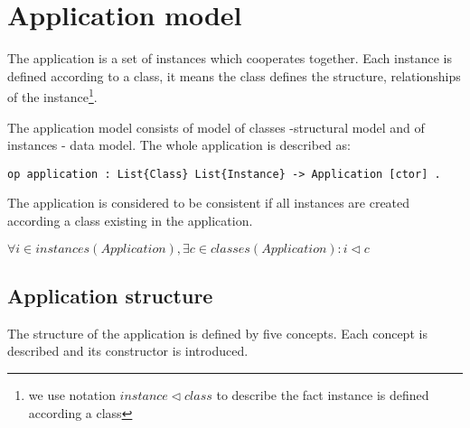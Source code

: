 \documentclass[11pt]{article}
\begin{document}
\section{Application model}
The application is a set of instances which cooperates together. Each instance is defined according to a class, it means the class defines the structure, relationships of the instance\footnote{we use notation $instance \lhd class$ to describe the fact instance is defined according a class}.

The application model consists of model of classes -structural model and of instances - data model. The whole application is described as:

\begin{verbatim}
op application : List{Class} List{Instance} -> Application [ctor] .
\end{verbatim}
The application is considered to be consistent if all instances are created according a class existing in the application. 

$\forall i \in instances(Application), \exists c \in classes(Application): i \lhd c $


\subsection{Application structure}
The structure of the application is defined by five concepts. Each concept is described and its constructor is introduced.
\end{document}

